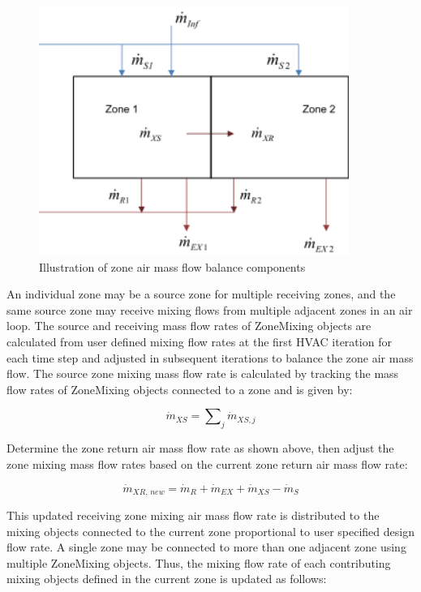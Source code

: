 \begin{figure}[hbtp] %
\centering
\includegraphics[width=0.9\textwidth, height=0.9\textheight, keepaspectratio=true]{media/image134.svg.png}
\caption{Illustration of zone air mass flow balance components \protect \label{fig:illustration-of-zone-air-mass-flow-balance}}
\end{figure}

An individual zone may be a source zone for multiple receiving zones, and the same source zone may receive mixing flows from multiple adjacent zones in an air loop. The source and receiving mass flow rates of ZoneMixing objects are calculated from user defined mixing flow rates at the first HVAC iteration for each time step and adjusted in subsequent iterations to balance the zone air mass flow. The source zone mixing mass flow rate is calculated by tracking the mass flow rates of ZoneMixing objects connected to a zone and is given by:

\begin{equation}
{\dot m_{XS}} = \sum\nolimits_j {{{\dot m}_{XS,j}}}
\end{equation}

Determine the zone return air mass flow rate as shown above, then adjust the zone mixing mass flow rates based on the current zone return air mass flow rate:

\begin{equation}
{\dot m_{XR,\,new}} = {\dot m_R} + {\dot m_{EX}} + {\dot m_{XS}} - {\dot m_S}
\end{equation}

This updated receiving zone mixing air mass flow rate is distributed to the mixing objects connected to the current zone proportional to user specified design flow rate. A single zone may be connected to more than one adjacent zone using multiple ZoneMixing objects. Thus, the mixing flow rate of each contributing mixing objects defined in the current zone is updated as follows:

